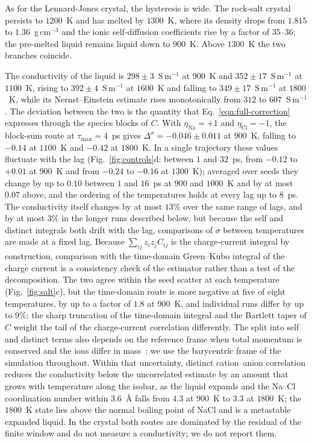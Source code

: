 As for the Lennard-Jones crystal, the hysteresis is wide.
The rock-salt crystal persists to $1200$~K and has melted by $1300$~K, where its density drops from $1.815$ to $1.36$~g\,cm$^{-3}$ and the ionic self-diffusion coefficients rise by a factor of $35$--$36$; the pre-melted liquid remains liquid down to $900$~K.
Above $1300$~K the two branches coincide.

The conductivity of the liquid is $298 \pm 3$~S\,m$^{-1}$ at $900$~K and $352 \pm 17$~S\,m$^{-1}$ at $1100$~K, rising to $392 \pm 4$~S\,m$^{-1}$ at $1600$~K and falling to $349 \pm 17$~S\,m$^{-1}$ at $1800$~K, while its Nernst--Einstein estimate rises monotonically from $312$ to $607$~S\,m$^{-1}$.
The deviation between the two is the quantity that Eq.~\eqref{eqn:full-correction} expresses through the species blocks of $C$.
With $\eta_{\mathrm{Na}} = +1$ and $\eta_{\mathrm{Cl}} = -1$, the block-sum route at $\tau_{\max} = 4$~ps gives $\Delta^{\sigma} = -0.046 \pm 0.011$ at $900$~K, falling to $-0.14$ at $1100$~K and $-0.42$ at $1800$~K.
In a single trajectory these values fluctuate with the lag (Fig.~\ref{fig:controls}d: between $1$ and $32$~ps, from $-0.12$ to $+0.01$ at $900$~K and from $-0.24$ to $-0.16$ at $1300$~K); averaged over seeds they change by up to $0.10$ between $1$ and $16$~ps at $900$ and $1000$~K and by at most $0.07$ above, and the ordering of the temperatures holds at every lag up to $8$~ps.
The conductivity itself changes by at most $13\%$ over the same range of lags, and by at most $3\%$ in the longer runs described below, but because the self and distinct integrals both drift with the lag, comparisons of $\sigma$ between temperatures are made at a fixed lag.
Because $\sum_{ij} z_{i} z_{j} C_{ij}$ is the charge-current integral by construction, comparison with the time-domain Green--Kubo integral of the charge current is a consistency check of the estimator rather than a test of the decomposition.
The two agree within the seed scatter at each temperature (Fig.~\ref{fig:salt}c), but the time-domain route is more negative at five of eight temperatures, by up to a factor of $1.8$ at $900$~K, and individual runs differ by up to $9\%$: the sharp truncation of the time-domain integral and the Bartlett taper of $\hat{C}$ weight the tail of the charge-current correlation differently.
The split into self and distinct terms also depends on the reference frame when total momentum is conserved and the ions differ in mass~\cite{kashyap11a,trullas94a}; we use the barycentric frame of the simulation throughout.
Within that uncertainty, distinct cation--anion correlation reduces the conductivity below the uncorrelated estimate by an amount that grows with temperature along the isobar, as the liquid expands and the Na--Cl coordination number within $3.6$~\AA{} falls from $4.3$ at $900$~K to $3.3$ at $1800$~K; the $1800$~K state lies above the normal boiling point of NaCl and is a metastable expanded liquid.
In the crystal both routes are dominated by the residual of the finite window and do not measure a conductivity; we do not report them.

